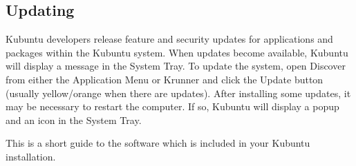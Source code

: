 \documentclass[letterpaper,10pt,english]{sphinxmanual}
\begin{document}
\subsection{Updating}
\label{\detokenize{docs/software-management/software:updating}}
\sphinxAtStartPar
Kubuntu developers release feature and security updates for applications and packages within the Kubuntu system. When updates become available, Kubuntu will display a message in the System Tray. To update the system, open Discover from either the Application Menu or Krunner and click the Update button (usually yellow/orange when there are updates). After installing some updates, it may be necessary to restart the computer. If so, Kubuntu will display a pop\sphinxhyphen{}up and an icon in the System Tray.

\noindent{}

\sphinxAtStartPar
This is a short guide to the software which is included in your Kubuntu installation.
\end{document}
